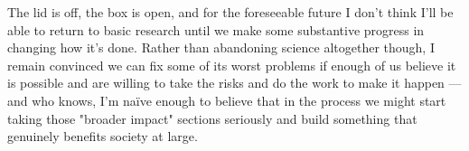 The lid is off, the box is open, and for the foreseeable future I don't think I'll be able to return to basic research until we make some substantive progress in changing how it's done. Rather than abandoning science altogether though, I remain convinced we can fix some of its worst problems if enough of us believe it is possible and are willing to take the risks and do the work to make it happen --- and who knows, I'm naïve enough to believe that in the process we might start taking those "broader impact" sections seriously and build something that genuinely benefits society at large.